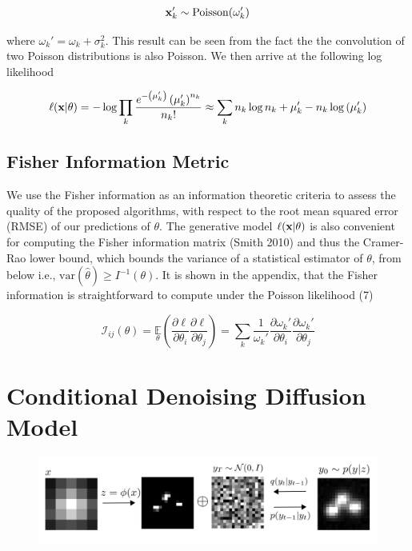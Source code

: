 \documentclass{article}
\begin{document}
\begin{equation}
\bold{x}_{k}' \sim \mathrm{Poisson}(\omega_{k}')
\end{equation}

where $\omega_{k}' = \omega_{k} + \sigma_{k}^{2}$. This result can be seen from the fact the the convolution of two Poisson distributions is also Poisson. We then arrive at the following log likelihood

\begin{equation}
\ell(\bold{x}|\theta) = -\log \prod_{k} \frac{e^{-\left(\mu_{k}'\right)}\left(\mu_{k}'\right)^{n_{k}}}{n_{k}!}
\approx \sum_{k}  n_{k}\log n_{k} + \mu_{k}' - n_{k}\log\left(\mu_{k}'\right)
\end{equation}

\subsection{Fisher Information Metric}

We use the Fisher information as an information theoretic criteria to assess the quality of the proposed algorithms, with respect to the root mean squared error (RMSE) of our predictions of $\theta$. The generative model $\ell(\bold{x}|\theta)$ is also convenient for computing the Fisher information matrix (Smith 2010) and thus the Cramer-Rao lower bound, which bounds the variance of a statistical estimator of $\theta$, from below i.e., $\mathrm{var}(\hat{\theta}) \geq I^{-1}(\theta)$. It is shown in the appendix, that the Fisher information is straightforward to compute under the Poisson likelihood (7)

\begin{equation}
\mathcal{I}_{ij}(\theta) = \underset{\theta}{\mathbb{E}}\left(\frac{\partial \ell}{\partial\theta_{i}}\frac{\partial\ell}{\partial\theta_{j}}\right) = \sum_{k}\frac{1}{\omega_{k}'}\frac{\partial \omega_{k}'}{\partial\theta_{i}}\frac{\partial \omega_{k}'}{\partial\theta_{j}}
\end{equation}

\section{Conditional Denoising Diffusion Model}


\begin{figure}
\includegraphics[scale=4.0]{Denoise.png}
\end{figure}
\end{document}

